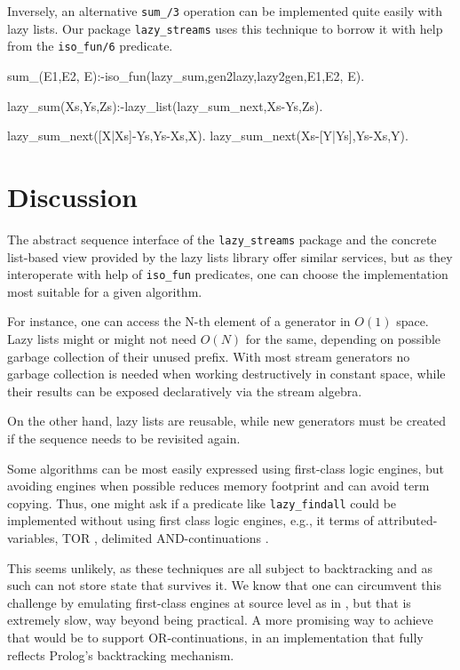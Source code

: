 \documentclass{new_tlp}
\begin{document}
Inversely, an alternative {\tt sum\_/3} operation  can be implemented 
quite easily with lazy lists. Our package {\tt lazy\_streams} 
uses this technique to borrow it with help from the {\tt iso\_fun/6} predicate.
\begin{code}
sum_(E1,E2, E):-iso_fun(lazy_sum,gen2lazy,lazy2gen,E1,E2, E).

lazy_sum(Xs,Ys,Zs):-lazy_list(lazy_sum_next,Xs-Ys,Zs).
  
lazy_sum_next([X|Xs]-Ys,Ys-Xs,X).
lazy_sum_next(Xs-[Y|Ys],Ys-Xs,Y).
\end{code}

\section{Discussion}\label{disc}

The abstract sequence interface of the {\tt lazy\_streams} package and
the concrete list-based view provided by the lazy lists library offer
similar services, but as they interoperate with help of {\tt iso\_fun} predicates,
one can choose the  implementation most suitable for a given algorithm.

For instance, one  can access the N-th element of a  generator in $O(1)$ space.
Lazy lists might or might not need $O(N)$ for the same, depending on possible garbage collection of their unused prefix.
With most stream generators no garbage collection is needed when working destructively in constant space, while their results can be exposed declaratively via the stream algebra.

On the other hand, lazy lists are reusable, while new generators 
must be created if the sequence needs to be revisited again.

Some algorithms can be most easily expressed using first-class logic engines, but
avoiding engines when possible reduces memory footprint and can avoid term copying.
Thus, one might ask if a predicate like {\tt lazy\_findall} could be implemented
without using first class logic engines, e.g., it terms of  
attributed-variables, 
TOR \cite{tor}, delimited AND-continuations \cite{delim}.

This seems unlikely, as  these techniques are all subject to backtracking and as such can not
store state that survives it. We know that one can circumvent this challenge
by emulating first-class engines at source level as in \cite{padl09inter}, but that is 
extremely slow, way beyond being practical. A more promising
way to achieve  that would be to support
OR-continuations, in an implementation that fully reflects Prolog's backtracking
mechanism.
\end{document}
